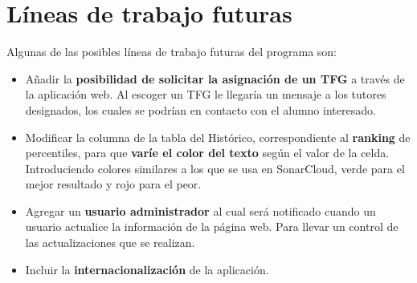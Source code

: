 \section{Líneas de trabajo futuras}
Algunas de las posibles líneas de trabajo futuras del programa son:
\begin{itemize}
	\item Añadir la \textbf{posibilidad de solicitar la asignación de un TFG} a través de la aplicación web. Al escoger un TFG le llegaría un mensaje a los tutores designados, los cuales se podrían en contacto con el alumno interesado. 
	\item Modificar la columna de la tabla del Histórico, correspondiente al \textbf{ranking} de percentiles, para que \textbf{varíe el color del texto} según el valor de la celda. Introduciendo colores similares a los que se usa en SonarCloud, verde para el mejor resultado y rojo para el peor.
	\item Agregar un \textbf{usuario administrador} al cual será notificado cuando un usuario actualice la información de la página web. Para llevar un control de las actualizaciones que se realizan.
	\item Incluir la \textbf{internacionalización} de la aplicación.
\end{itemize}
